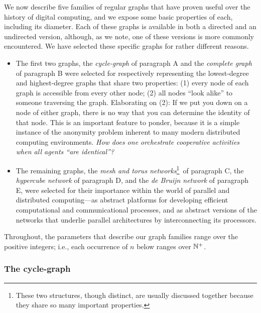 We now describe five families of regular graphs that have proven
useful over the history of digital computing, and we expose some basic
properties of each, including its diameter.  Each of these graphs is
available in both a directed and an undirected version, although, as
we note, one of these versions is more commonly encountered.  We have
selected these specific graphs for rather different reasons.
\begin{itemize}
\item
The first two graphs, the {\it cycle-graph} of paragraph {\small\sf A}
and the {\it complete graph} of paragraph {\small\sf B} were selected
for respectively representing the lowest-degree and highest-degree
graphs that share two properties: (1) every node of each graph is
accessible from every other node; (2) all nodes ``look alike'' to
someone traversing the graph.  Elaborating on (2): If we put you down
on a node of either graph, there is no way that you can determine the
identity of that node.  This is an important feature to ponder,
because it is a simple instance of the anonymity problem inherent to
many modern distributed computing environments.  {\it How does one
  orchestrate cooperative activities when all agents ``are
  identical''?}

\item
The remaining graphs, the {\it mesh and torus networks}\footnote{These
  two structures, though distinct, are usually discussed together
  because they share so many important properties.}~of paragraph
{\small\sf C}, the {\it hypercube network} of paragraph {\small\sf D},
and the {\it de Bruijn network} of paragraph {\small\sf E}, were
selected for their importance within the world of parallel and
distributed computing---as abstract platforms for developing efficient
computational and communicational processes, and as abstract versions
of the networks that underlie parallel architectures by
interconnecting its processors.
\end{itemize}
Throughout, the parameters that describe our graph families range over
the positive integers; i.e., each occurrence of $n$ below ranges over
$\mathbb{N}^+$.

\subsubsection{The cycle-graph}

